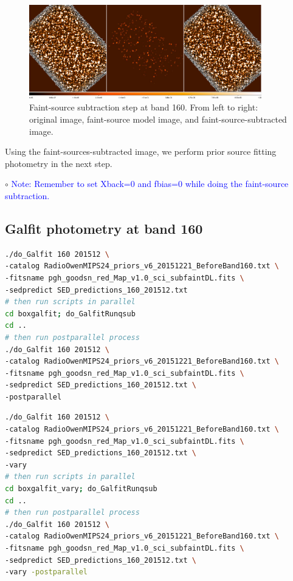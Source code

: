 \documentclass[11pt,a4paper]{article}
\begin{document}
\begin{figure}[H]
	\caption{Faint-source subtraction step at band 160. From left to right: original image, faint-source model image, and faint-source-subtracted image.}
	\includegraphics[width=0.9\textwidth]{galfit_160_FIT_goodsn_160_Map_201512_Galsub}
\end{figure}

Using the faint-sources-subtracted image, we perform prior source fitting photometry in the next step. 

\indent\hspace{15pt}$\circ$ 
\textcolor{blue}{Note: Remember to set Xback=0 and fbias=0 while doing the faint-source subtraction.}
\\

\subsection{Galfit photometry at band 160}
\label{Band160_Galfit}

\begin{lstlisting}[language=bash]
./do_Galfit 160 201512 \
-catalog RadioOwenMIPS24_priors_v6_20151221_BeforeBand160.txt \
-fitsname pgh_goodsn_red_Map_v1.0_sci_subfaintDL.fits \
-sedpredict SED_predictions_160_201512.txt
# then run scripts in parallel 
cd boxgalfit; do_GalfitRunqsub
cd ..
# then run postparallel process
./do_Galfit 160 201512 \
-catalog RadioOwenMIPS24_priors_v6_20151221_BeforeBand160.txt \
-fitsname pgh_goodsn_red_Map_v1.0_sci_subfaintDL.fits \
-sedpredict SED_predictions_160_201512.txt \
-postparallel
\end{lstlisting}

\begin{lstlisting}[language=bash]
./do_Galfit 160 201512 \
-catalog RadioOwenMIPS24_priors_v6_20151221_BeforeBand160.txt \
-fitsname pgh_goodsn_red_Map_v1.0_sci_subfaintDL.fits \
-sedpredict SED_predictions_160_201512.txt \
-vary
# then run scripts in parallel 
cd boxgalfit_vary; do_GalfitRunqsub
cd ..
# then run postparallel process
./do_Galfit 160 201512 \
-catalog RadioOwenMIPS24_priors_v6_20151221_BeforeBand160.txt \
-fitsname pgh_goodsn_red_Map_v1.0_sci_subfaintDL.fits \
-sedpredict SED_predictions_160_201512.txt \
-vary -postparallel
\end{lstlisting}
\end{document}
